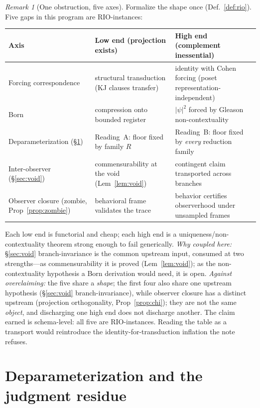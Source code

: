 \documentclass[11pt]{article}
\theoremstyle{definition}
\theoremstyle{remark}
\newtheorem*{remark}{Remark}
\begin{document}
\begin{remark}[One obstruction, five axes]
Formalize the shape once (Def.~\ref{def:rio}). Five gaps in this program are RIO-instances:
\begin{center}
\renewcommand{\arraystretch}{1.2}
\begin{tabular}{@{}p{} p{} p{}@{}}
\toprule
\textbf{Axis} & \textbf{Low end (projection exists)} & \textbf{High end (complement inessential)}\\
\midrule
Forcing correspondence & structural transduction (KJ clauses transfer) & identity with Cohen forcing (poset representation-independent)\\
Born & compression onto bounded register & $|\psi|^2$ forced by Gleason non-contextuality\\
Deparameterization (\S\ref{sec:deparam}) & Reading~A: floor fixed by family $R$ & Reading~B: floor fixed by \emph{every} reduction family\\
Inter-observer (\S\ref{sec:void}) & commensurability at the void (Lem~\ref{lem:void}) & contingent claim transported across branches\\
Observer closure (zombie, Prop~\ref{prop:zombie}) & behavioral frame validates the trace & behavior certifies observerhood under unsampled frames\\
\bottomrule
\end{tabular}
\end{center}
Each low end is functorial and cheap; each high end is a uniqueness/non-contextuality theorem strong
enough to fail generically. \emph{Why coupled here:} \S\ref{sec:void} branch-invariance is the common
upstream input, consumed at two strengths---as commensurability it is proved (Lem~\ref{lem:void}); as
the non-contextuality hypothesis a Born derivation would need, it is open. \emph{Against overclaiming:}
the five share a \emph{shape}; the first four also share one upstream hypothesis (\S\ref{sec:void}
branch-invariance), while observer closure has a distinct upstream (projection orthogonality,
Prop~\ref{prop:chi}); they are not the same \emph{object}, and discharging one high end does not
discharge another. The claim earned is schema-level: all five are RIO-instances. Reading the table as a transport would reintroduce the
identity-for-transduction inflation the note refuses.
\end{remark}

\section{Deparameterization and the judgment residue}\label{sec:deparam}
\end{document}

